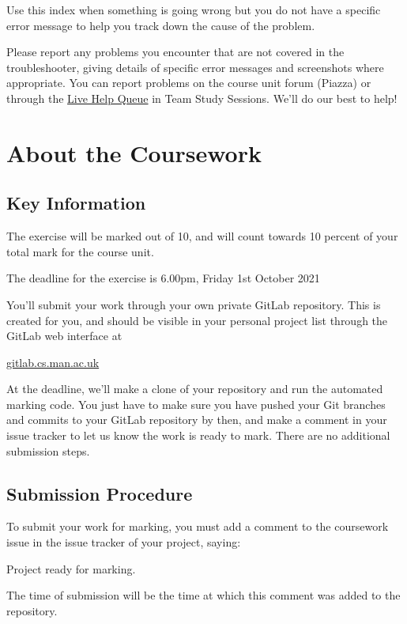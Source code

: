 \documentclass[
]{book}
\begin{document}
Use this index when something is going wrong but you do not have a specific error message to help you track down the cause of the problem.

Please report any problems you encounter that are not covered in the troubleshooter, giving details of specific error messages and screenshots where appropriate. You can report problems on the course unit forum (Piazza) or through the \href{https://gitlab.cs.man.ac.uk/comp23311_2021/COMP23311-Live-Help-Queue}{Live Help Queue} in Team Study Sessions. We'll do our best to help!

\hypertarget{about}{%
\section{About the Coursework}\label{about}}

\hypertarget{key}{%
\subsection{Key Information}\label{key}}

The exercise will be marked out of 10, and will count towards 10 percent of your total mark for the course unit.

The deadline for the exercise is 6.00pm, Friday 1st October 2021

You'll submit your work through your own private GitLab repository. This is created for you, and should be visible in your personal project list through the GitLab web interface at

\href{https://gitlab.cs.man.ac.uk}{gitlab.cs.man.ac.uk}

At the deadline, we'll make a clone of your repository and run the automated marking code. You just have to make sure you have pushed your Git branches and commits to your GitLab repository by then, and make a comment in your issue tracker to let us know the work is ready to mark. There are no additional submission steps.

\hypertarget{submission}{%
\subsection{Submission Procedure}\label{submission}}

To submit your work for marking, you must add a comment to the coursework issue in the issue tracker of your project, saying:

Project ready for marking.

The time of submission will be the time at which this comment was added to the repository.
\end{document}
